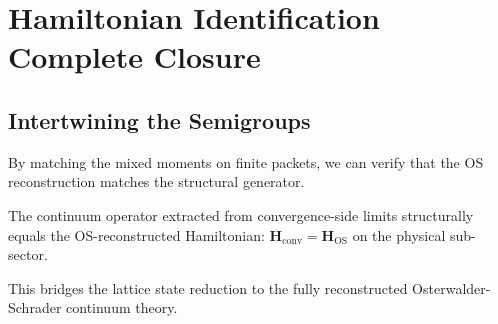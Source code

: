 \chapter{Hamiltonian Identification Complete Closure}\label{app:hamiltonian_closure}
\section{Intertwining the Semigroups}
By matching the mixed moments on finite packets, we can verify that the OS reconstruction matches the structural generator.
\begin{theorem}
The continuum operator extracted from convergence-side limits structurally equals the OS-reconstructed Hamiltonian: $\mathbf{H}_{\mathrm{conv}} = \mathbf{H}_{\mathrm{OS}}$ on the physical sub-sector.
\end{theorem}
This bridges the lattice state reduction to the fully reconstructed Osterwalder-Schrader continuum theory.
